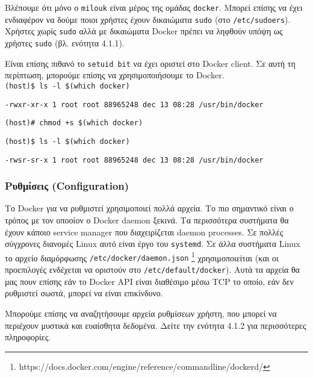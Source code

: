 Βλέπουμε ότι μόνο ο \texttt{\textlatin{milouk}} είναι μέρος της ομάδας
\texttt{\textlatin{docker}}. Μπορεί επίσης να έχει ενδιαφέρον να δούμε ποιοι
χρήστες έχουν δικαιώματα \texttt{\textlatin{sudo}} (στο
\texttt{\textlatin{/etc/sudoers}}). Χρήστες χωρίς \texttt{\textlatin{sudo}} αλλά
με δικαιώματα \textlatin{Docker} πρέπει να ληφθούν υπόψη ως χρήστες
\texttt{\textlatin{sudo}} (βλ. ενότητα 4.1.1).

Είναι επίσης πιθανό το \texttt{\textlatin{setuid bit}} να έχει οριστεί στο
\textlatin{Docker client}. Σε αυτή τη περίπτωση, μπορούμε επίσης να
χρησιμοποιήσουμε το \textlatin{Docker}. \\

\texttt{\textlatin{(host)\$ ls -l \$(which docker)}}

\texttt{\textlatin{-rwxr-xr-x 1 root root 88965248 dec 13 08:28 /usr/bin/docker}}

\texttt{\textlatin{(host)\# chmod +s \$(which docker)}}

\texttt{\textlatin{(host)\$ ls -l \$(which docker)}}

\texttt{\textlatin{-rwsr-sr-x 1 root root 88965248 dec 13 08:28 /usr/bin/docker}} \\

\subsubsection{Ρυθμίσεις (\textlatin{Configuration})}

Το \textlatin{Docker} για να ρυθμιστεί χρησιμοποιεί πολλά αρχεία. Το πιο
σημαντικό είναι ο τρόπος με τον οποοίον ο \textlatin{Docker daemon} ξεκινά. Τα
περισσότερα συστήματα θα έχουν κάποιο \textlatin{service manager} που
διαχειρίζεται \textlatin{daemon processes}. Σε πολλές σύγχρονες διανομές
\textlatin{Linux} αυτό είναι έργο του \texttt{\textlatin{systemd}}. Σε άλλα
συστήματα \textlatin{Linux} το αρχείο διαμόρφωσης
\texttt{\textlatin{/etc/docker/daemon.json}}
\footnote{\textlatin{https://docs.docker.com/engine/reference/commandline/dockerd/}}
χρησιμοποιείται (και οι προεπιλογές ενδέχεται να οριστούν στο
\texttt{\textlatin{/etc/default/docker}}). Αυτά τα αρχεία θα μας πουν επίσης εάν
το \textlatin{Docker API} είναι διαθέσιμο μέσω \textlatin{TCP} το οποίο, εάν δεν
ρυθμιστεί σωστά, μπορεί να είναι επικίνδυνο.

Μπορούμε επίσης να αναζητήσουμε αρχεία ρυθμίσεων χρήστη, που μπορεί να περιέχουν
μυστικά και ευαίσθητα δεδομένα. Δείτε την ενότητα 4.1.2 για περισσότερες
πληροφορίες.

